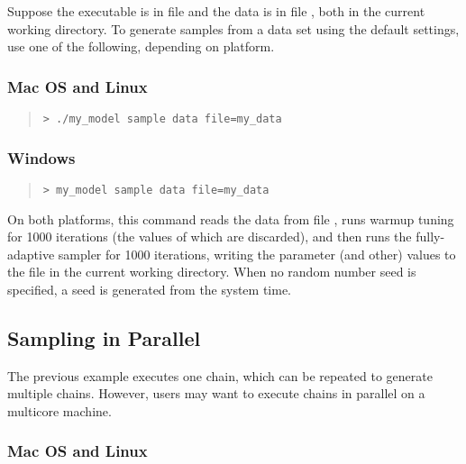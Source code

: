 Suppose the executable is in file  and the data is in
file , both in the current working directory.  To
generate samples from a data set using the default settings, use one
of the following, depending on platform.

\subsubsection{Mac OS and Linux}
%
\begin{quote}
\begin{Verbatim}[fontshape=sl]
> ./my_model sample data file=my_data
\end{Verbatim}
\end{quote}

\subsubsection{Windows}
%
\begin{quote}
\begin{Verbatim}[fontshape=sl]
> my_model sample data file=my_data
\end{Verbatim}
\end{quote}
%
On both platforms, this command reads the data from file
, runs warmup tuning for 1000 iterations (the values
of which are discarded), and then runs the fully-adaptive \NUTS
sampler for 1000 iterations, writing the parameter (and other) values
to the file  in the current working directory.  When
no random number seed is specified, a seed is generated from the
system time.

\subsection{Sampling in Parallel}

The previous example executes one chain, which can be repeated to 
generate multiple chains. However, users may want to execute chains
in parallel on a multicore machine. 

\subsubsection{Mac OS and Linux}


